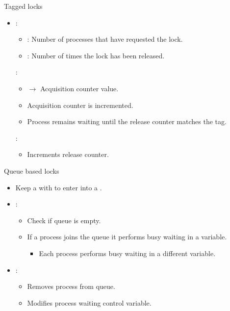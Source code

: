 \begin{frame}[t]{Tagged locks}
\begin{itemize}
  \item {}:
    \begin{itemize}
      \item {}: Number of processes that have requested the lock.
      \item {}: Number of times the lock has been released.
    \end{itemize}

  :
    \begin{itemize}
      \item {} $\rightarrow$ Acquisition counter value.
      \item Acquisition counter is incremented.
      \item Process remains waiting until the release counter matches the tag.
    \end{itemize}

  :
    \begin{itemize}
      \item Increments release counter.
    \end{itemize}
\end{itemize}
\end{frame}


\begin{frame}[t]{Queue based locks}
\begin{itemize}
  \item Keep a  with  
        to enter into a .

  \item {}:
    \begin{itemize}
      \item Check if queue is empty.
      \item If a process joins the queue it performs busy waiting in a variable.
      \begin{itemize}
        \item Each process performs busy waiting in a different variable.
      \end{itemize}
    \end{itemize}

  \item {}:
    \begin{itemize}
      \item Removes process from queue.
      \item Modifies process waiting control variable.
    \end{itemize}

\end{itemize}
\end{frame}
